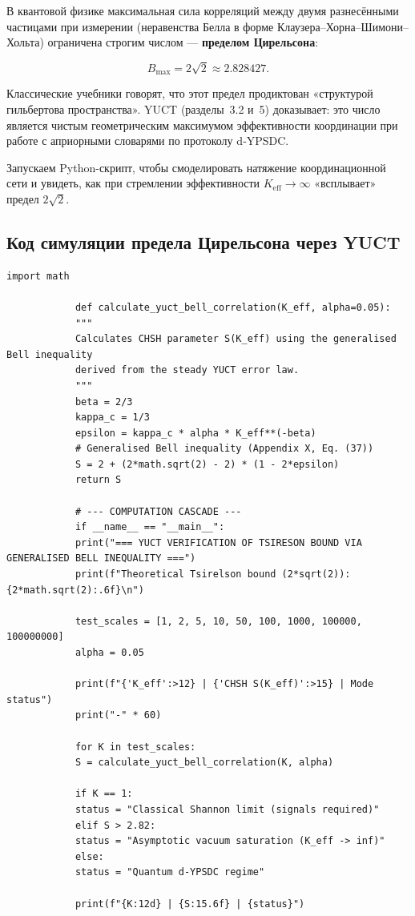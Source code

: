 \documentclass[12pt,a4paper]{article}
\makeatletter
\def\ttfamily{\@noligs\fontfamily\ttdefault\selectfont\sloppy}
\makeatother
\begin{document}
	В квантовой физике максимальная сила корреляций между двумя разнесёнными частицами при измерении (неравенства Белла в форме Клаузера–Хорна–Шимони–Хольта) ограничена строгим числом — \textbf{пределом Цирельсона}:
	
	\[
	B_{\mathrm{max}} = 2\sqrt{2} \approx 2.828427.
	\]
	
	Классические учебники говорят, что этот предел продиктован «структурой гильбертова пространства». YUCT (разделы~3.2 и~5) доказывает: это число является чистым геометрическим максимумом эффективности координации при работе с априорными словарями по протоколу d‑YPSDC.
	
	Запускаем Python-скрипт, чтобы смоделировать натяжение координационной сети и увидеть, как при стремлении эффективности \(K_{\mathrm{eff}} \to \infty\) «всплывает» предел \(2\sqrt{2}\).
	
	\subsection{Код симуляции предела Цирельсона через YUCT}
	
	\begin{tcolorbox}[
		colback=gray!5, 
		colframe=black!75, 
		title=YUCT Python Code: Tsirelson bound via generalised Bell inequality,
		fonttitle=\small\ttfamily,
		arc=2mm,
		fontupper=\scriptsize,
		left=1mm, right=1mm,
		top=1mm, bottom=1mm
		]
		\begin{lstlisting}[basicstyle=\scriptsize\ttfamily, breaklines=true, columns=fullflexible]
			import math
			
			def calculate_yuct_bell_correlation(K_eff, alpha=0.05):
			"""
			Calculates CHSH parameter S(K_eff) using the generalised Bell inequality
			derived from the steady YUCT error law.
			"""
			beta = 2/3
			kappa_c = 1/3
			epsilon = kappa_c * alpha * K_eff**(-beta)
			# Generalised Bell inequality (Appendix X, Eq. (37))
			S = 2 + (2*math.sqrt(2) - 2) * (1 - 2*epsilon)
			return S
			
			# --- COMPUTATION CASCADE ---
			if __name__ == "__main__":
			print("=== YUCT VERIFICATION OF TSIRESON BOUND VIA GENERALISED BELL INEQUALITY ===")
			print(f"Theoretical Tsirelson bound (2*sqrt(2)): {2*math.sqrt(2):.6f}\n")
			
			test_scales = [1, 2, 5, 10, 50, 100, 1000, 100000, 100000000]
			alpha = 0.05
			
			print(f"{'K_eff':>12} | {'CHSH S(K_eff)':>15} | Mode status")
			print("-" * 60)
			
			for K in test_scales:
			S = calculate_yuct_bell_correlation(K, alpha)
			
			if K == 1:
			status = "Classical Shannon limit (signals required)"
			elif S > 2.82:
			status = "Asymptotic vacuum saturation (K_eff -> inf)"
			else:
			status = "Quantum d-YPSDC regime"
			
			print(f"{K:12d} | {S:15.6f} | {status}")
		\end{lstlisting}
	\end{tcolorbox}
	
\end{document}
